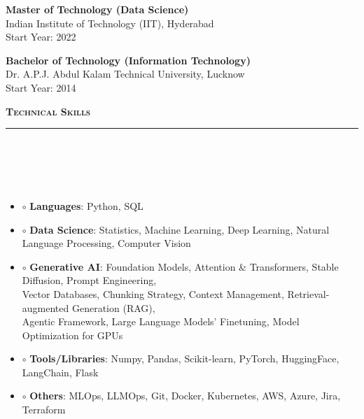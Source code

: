 \documentclass[a4paper,10pt]{article}
\newcommand{\lsep}{-0.5cm}
\newcommand{\resheading}[1]{{\small
        {
            \begin{minipage}
                {0.992\textwidth}\textbf{{\textsc{#1 \vphantom{p\^{E}} }}}
                \\[-0.3cm]
                \hrule
            \end{minipage}
            \\[-0.5cm]
        }
 }}
\begin{document}
\begin{multicols}{2}

    \begin{list}{}{\setlength{\leftmargin}{0.5cm} \setlength{\rightmargin}{0cm} \setlength{\itemindent}{0cm}}
        \item 
        \textbf{Master of Technology (Data Science)} \\
        Indian Institute of Technology (IIT), Hyderabad \\
        Start Year: 2022
    \end{list}

    \columnbreak

    \begin{list}{}{\setlength{\leftmargin}{0.5cm} \setlength{\rightmargin}{0cm} \setlength{\itemindent}{0cm}}
        \item 
        \textbf{Bachelor of Technology (Information Technology)} \\
        Dr. A.P.J. Abdul Kalam Technical University, Lucknow \\
        Start Year: 2014
    \end{list}

\end{multicols}

\vspace{-4pt}
\noindent
\resheading{\textbf{\large Technical Skills}}\\[\lsep] 
\\[-0.3cm]


\begin{itemize}
  \item[] $\circ$ \hspace{0.0cm} \textbf{Languages}: Python, SQL\\[-0.55cm]
  \item[] $\circ$  \hspace{0.0cm} \textbf{Data Science}: Statistics, Machine Learning, Deep Learning, Natural Language Processing, Computer Vision  \\[-0.55cm]
  \item[] $\circ$  \hspace{0.0cm} \textbf{Generative AI}: Foundation Models, Attention \& Transformers, Stable Diffusion, Prompt Engineering, \\ \hspace*{0.3cm} Vector Databases, Chunking Strategy, Context Management, Retrieval-augmented Generation (RAG), \\ \hspace*{0.3cm} Agentic Framework, Large Language Models' Finetuning, Model Optimization for GPUs \\[-0.55cm]
  \item[] $\circ$  \hspace{0.0cm} \textbf{Tools/Libraries}: Numpy, Pandas, Scikit-learn, PyTorch, HuggingFace, LangChain, Flask \\[-0.55cm]
  \item[] $\circ$  \hspace{0.0cm} \textbf{Others}: MLOps, LLMOps, Git, Docker, Kubernetes, AWS, Azure, Jira, Terraform
\end{itemize}
\end{document}
